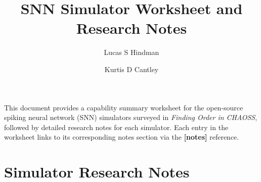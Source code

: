 \documentclass[portrait, 11pt]{article}
\title{SNN Simulator Worksheet and Research Notes}
\author{Lucas S Hindman \and Kurtis D Cantley}
\date{}
\begin{document}
\maketitle
\thispagestyle{empty}

\bigskip
\noindent
This document provides a capability summary worksheet for the open-source spiking neural
network (SNN) simulators surveyed in \emph{Finding Order in CHAOSS}, followed by
detailed research notes for each simulator. Each entry in the worksheet links to its
corresponding notes section via the \textbf{[notes]} reference. 

\clearpage



\clearpage

\section*{Simulator Research Notes}


\end{document}
